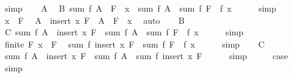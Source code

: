 \begin{isabellebody}
\ simp\isanewline
\ \ \isamarkupfalse%
\ A\ \isamarkupfalse%
\ B{\isacharcolon}{\kern0pt}\ {\isachardoublequoteopen}sum\ f\ {\isacharparenleft}{\kern0pt}{\isacharparenleft}{\kern0pt}A\ {\isacharminus}{\kern0pt}\ F{\isacharparenright}{\kern0pt}\ {\isacharminus}{\kern0pt}\ {\isacharbraceleft}{\kern0pt}x{\isacharbraceright}{\kern0pt}{\isacharparenright}{\kern0pt}\ {\isacharequal}{\kern0pt}\ sum\ f\ A\ {\isacharminus}{\kern0pt}\ sum\ f\ F\ {\isacharminus}{\kern0pt}\ f\ x{\isachardoublequoteclose}\isanewline
\ \ \ \ \isamarkupfalse%
\ simp\isanewline
\ \ \isamarkupfalse%
\ {\isacartoucheopen}x\ {\isasymnotin}\ F{\isacartoucheclose}\ \isamarkupfalse%
\ {\isachardoublequoteopen}A\ {\isacharminus}{\kern0pt}\ insert\ x\ F\ {\isacharequal}{\kern0pt}\ {\isacharparenleft}{\kern0pt}A\ {\isacharminus}{\kern0pt}\ F{\isacharparenright}{\kern0pt}\ {\isacharminus}{\kern0pt}\ {\isacharbraceleft}{\kern0pt}x{\isacharbraceright}{\kern0pt}{\isachardoublequoteclose}\ \isamarkupfalse%
\ auto\isanewline
\ \ \isamarkupfalse%
\ B\ \isamarkupfalse%
\ C{\isacharcolon}{\kern0pt}\ {\isachardoublequoteopen}sum\ f\ {\isacharparenleft}{\kern0pt}A\ {\isacharminus}{\kern0pt}\ insert\ x\ F{\isacharparenright}{\kern0pt}\ {\isacharequal}{\kern0pt}\ sum\ f\ A\ {\isacharminus}{\kern0pt}\ sum\ f\ F\ {\isacharminus}{\kern0pt}\ f\ x{\isachardoublequoteclose}\isanewline
\ \ \ \ \isamarkupfalse%
\ simp\isanewline
\ \ \isamarkupfalse%
\ {\isacartoucheopen}finite\ F{\isacartoucheclose}\ {\isacartoucheopen}x\ {\isasymnotin}\ F{\isacartoucheclose}\ \isamarkupfalse%
\ {\isachardoublequoteopen}sum\ f\ {\isacharparenleft}{\kern0pt}insert\ x\ F{\isacharparenright}{\kern0pt}\ {\isacharequal}{\kern0pt}\ sum\ f\ F\ {\isacharplus}{\kern0pt}\ f\ x{\isachardoublequoteclose}\isanewline
\ \ \ \ \isamarkupfalse%
\ simp\isanewline
\ \ \isamarkupfalse%
\ C\ \isamarkupfalse%
\ {\isachardoublequoteopen}sum\ f\ {\isacharparenleft}{\kern0pt}A\ {\isacharminus}{\kern0pt}\ insert\ x\ F{\isacharparenright}{\kern0pt}\ {\isacharequal}{\kern0pt}\ sum\ f\ A\ {\isacharminus}{\kern0pt}\ sum\ f\ {\isacharparenleft}{\kern0pt}insert\ x\ F{\isacharparenright}{\kern0pt}{\isachardoublequoteclose}\isanewline
\ \ \ \ \isamarkupfalse%
\ simp\isanewline
\ \ \isamarkupfalse%
\ \isamarkupfalse%
\ {\isacharquery}{\kern0pt}case\ \isamarkupfalse%
\ simp\isanewline

\end{isabellebody}

